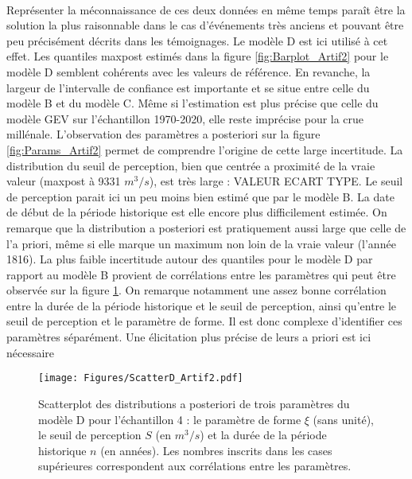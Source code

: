\documentclass[11pt]{article}
\begin{document}
	\paragraph{} Représenter la méconnaissance de ces deux données en même temps paraît être la solution la plus raisonnable dans le cas d'événements très anciens et pouvant être peu précisément décrits dans les témoignages. Le modèle D est ici utilisé à cet effet. Les quantiles maxpost estimés dans la figure \ref{fig:Barplot_Artif2} pour le modèle D semblent cohérents avec les valeurs de référence. En revanche, la largeur de l'intervalle de confiance est importante et se situe entre celle du modèle B et du modèle C. Même si l'estimation est plus précise que celle du modèle GEV sur l'échantillon 1970-2020, elle reste imprécise pour la crue millénale. L'observation des paramètres a posteriori sur la figure \ref{fig:Params_Artif2} permet de comprendre l'origine de cette large incertitude. La distribution du seuil de perception, bien que centrée a proximité de la vraie valeur (maxpost à 9331 $m^3/s$), est très large : VALEUR ECART TYPE. Le seuil de perception parait ici un peu moins bien estimé que par le modèle B. La date de début de la période historique est elle encore plus difficilement estimée. On remarque que la distribution a posteriori est pratiquement aussi large que celle de l'a priori, même si elle marque un maximum non loin de la vraie valeur (l'année 1816). La plus faible incertitude autour des quantiles pour le modèle D par rapport au modèle B provient de corrélations entre les paramètres qui peut être observée sur la figure \ref{fig:ScatterD_Artif2}. On remarque notamment une assez bonne corrélation entre la durée de la période historique et le seuil de perception, ainsi qu'entre le seuil de perception et le paramètre de forme. Il est donc complexe d'identifier ces paramètres séparément. Une élicitation plus précise de leurs a priori est ici nécessaire 
	
	\begin{figure}[h]
		\centering
		\texttt{[image: Figures/ScatterD\_Artif2.pdf]}
		\caption{Scatterplot des distributions a posteriori de trois paramètres du modèle D pour l'échantillon 4 : le paramètre de forme $\xi$ (sans unité), le seuil de perception $S$ (en $m^3/s$) et la durée de la période historique $n$ (en années). Les nombres inscrits dans les cases supérieures correspondent aux corrélations entre les paramètres.}
		\label{fig:ScatterD_Artif2}
	\end{figure}
	
\end{document}
